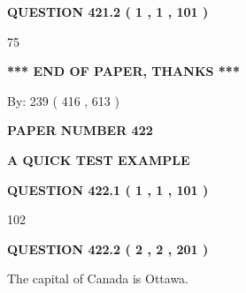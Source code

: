 \documentclass[12pt]{article}
\begin{document}
{\textbf{\Large{QUESTION
421.2 
 ( 1 , 1 , 101 )
}}}
  
  
 
 
\noindent{}

75
 
 
   
   
 \vspace{0.2in}
 
   
   
   
   
\vspace{1.0in} 
{\textbf{\large{ *** END OF PAPER, THANKS *** }}} 
   
   
\hspace{1.0in} By: 
 239 ( 416 ,  613 )
   
   
   
   
\newpage 
\setcounter{page}{ 
   422001 } 
   
   
   
   
 {\textbf{ \Large{ PAPER NUMBER  422  }}}
   
   
\vspace{0.2in}
   
   
   
   
   
   
 \vspace{0.2in}
{\LARGE {\textbf{ A QUICK TEST EXAMPLE}}}
   
   
  
\vspace{0.2in}
  
{\textbf{\Large{QUESTION
422.1 
 ( 1 , 1 , 101 )
}}}
  
  
 
 
\noindent{}

102
 
 
  
\vspace{0.2in}
  
{\textbf{\Large{QUESTION
422.2 
 ( 2 , 2 , 201 )
}}}
  
  
 
 
\noindent{}
 
 
The capital of Canada is Ottawa.
 
\end{document}
